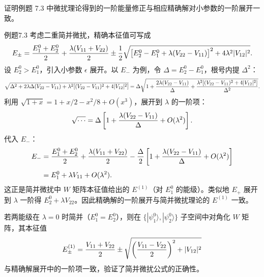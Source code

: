 \begin{question}
证明例题 7.3 中微扰理论得到的一阶能量修正与相应精确解对小参数的一阶展开一致。
\end{question}
\begin{solution}
例题7.3 考虑二重简并微扰，精确本征值可写成
\[
E_\pm={E_1^0+E_2^0\over2}+{\lambda(V_{11}+V_{22})\over2}
\pm{1\over2}\sqrt{\bigl[E_2^0-E_1^0+\lambda(V_{22}-V_{11})\bigr]^2+4\lambda^2|V_{12}|^2}.
\]
设 $E_2^0>E_1^0$，引入小参数 $\epsilon$ 展开。以 $E_-$ 为例，令 $\Delta=E_2^0-E_1^0$，根号内提 $\Delta^2$：
\[
\sqrt{\Delta^2+2\lambda\Delta(V_{22}-V_{11})+\lambda^2[(V_{22}-V_{11})^2+4|V_{12}|^2]}
=\Delta\sqrt{1+{2\lambda(V_{22}-V_{11})\over\Delta}
+{\lambda^2[(V_{22}-V_{11})^2+4|V_{12}|^2]\over\Delta^2}}.
\]
利用 $\sqrt{1+x}=1+x/2-x^2/8+O(x^3)$，展开到 $\lambda$ 的一阶项：
\[
\sqrt{\cdots}=\Delta\left[1+{\lambda(V_{22}-V_{11})\over\Delta}+O(\lambda^2)\right].
\]
代入 $E_-$：
\[
\begin{aligned}
E_-&={E_1^0+E_2^0\over2}+{\lambda(V_{11}+V_{22})\over2}
-{\Delta\over2}\left[1+{\lambda(V_{22}-V_{11})\over\Delta}+O(\lambda^2)\right] \\[4pt]
&=E_1^0+\lambda V_{11}+O(\lambda^2).
\end{aligned}
\]
这正是简并微扰中 $W$ 矩阵本征值给出的 $E^{(1)}$（对 $E_1^0$ 的能级）。类似地 $E_+$ 展开到 $\lambda$ 一阶得 $E_2^0+\lambda V_{22}$。因此精确解的一阶展开与简并微扰理论的 $E^{(1)}$ 一致。

若两能级在 $\lambda=0$ 时简并（$E_1^0=E_2^0$），则在 $\{|\psi_1^0\rangle,|\psi_2^0\rangle\}$ 子空间中对角化 $W$ 矩阵，其本征值
\[
E_\pm^{(1)}={V_{11}+V_{22}\over2}\pm\sqrt{\left({V_{11}-V_{22}\over2}\right)^2+|V_{12}|^2}
\]
与精确解展开中的一阶项一致，验证了简并微扰公式的正确性。
\end{solution}


